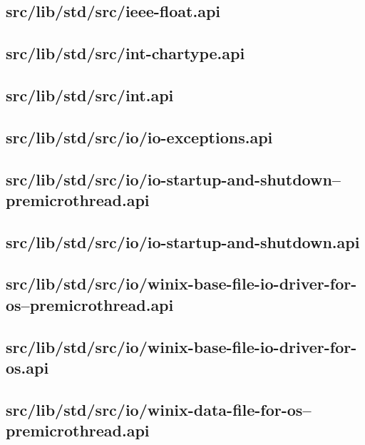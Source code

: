 \subsection{src/lib/std/src/ieee-float.api}


\subsection{src/lib/std/src/int-chartype.api}


\subsection{src/lib/std/src/int.api}


\subsection{src/lib/std/src/io/io-exceptions.api}


\subsection{src/lib/std/src/io/io-startup-and-shutdown--premicrothread.api}


\subsection{src/lib/std/src/io/io-startup-and-shutdown.api}


\subsection{src/lib/std/src/io/winix-base-file-io-driver-for-os--premicrothread.api}


\subsection{src/lib/std/src/io/winix-base-file-io-driver-for-os.api}


\subsection{src/lib/std/src/io/winix-data-file-for-os--premicrothread.api}


